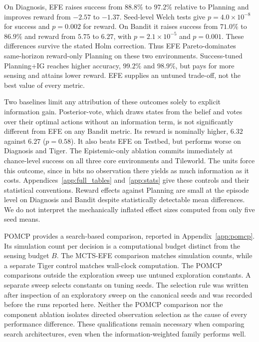 \documentclass[runningheads]{llncs}
\begin{document}
On Diagnosis, EFE raises success from $88.8\%$ to $97.2\%$ relative to Planning and improves reward from $-2.57$ to $-1.37$. Seed-level Welch tests give $p=4.0{\times}10^{-8}$ for success and $p=0.002$ for reward. On Bandit it raises success from $71.0\%$ to $86.9\%$ and reward from $5.75$ to $6.27$, with $p=2.1{\times}10^{-5}$ and $p=0.001$. These differences survive the stated Holm correction. Thus EFE Pareto-dominates same-horizon reward-only Planning on these two environments. Success-tuned Planning+IG reaches higher accuracy, $99.2\%$ and $98.9\%$, but pays for more sensing and attains lower reward. EFE supplies an untuned trade-off, not the best value of every metric.

Two baselines limit any attribution of these outcomes solely to explicit information gain. Posterior-vote, which draws states from the belief and votes over their optimal actions without an information term, is not significantly different from EFE on any Bandit metric. Its reward is nominally higher, $6.32$ against $6.27$ ($p=0.58$). It also beats EFE on Testbed, but performs worse on Diagnosis and Tiger. The Epistemic-only ablation commits immediately at chance-level success on all three core environments and Tileworld. The units force this outcome, since in bits no observation there yields as much information as it costs. Appendices~\ref{app:full_tables} and~\ref{app:stats} give these controls and their statistical conventions. Reward effects against Planning are small at the episode level on Diagnosis and Bandit despite statistically detectable mean differences. We do not interpret the mechanically inflated effect sizes computed from only five seed means.

POMCP provides a search-based comparison, reported in Appendix~\ref{app:pomcp}. Its simulation count per decision is a computational budget distinct from the sensing budget $B$. The MCTS-EFE comparison matches simulation counts, while a separate Tiger control matches wall-clock computation. The POMCP comparisons outside the exploration sweep use untuned exploration constants. A separate sweep selects constants on tuning seeds. The selection rule was written after inspection of an exploratory sweep on the canonical seeds and was recorded before the runs reported here. Neither the POMCP comparison nor the component ablation isolates directed observation selection as the cause of every performance difference. These qualifications remain necessary when comparing search architectures, even when the information-weighted family performs well.
\end{document}
